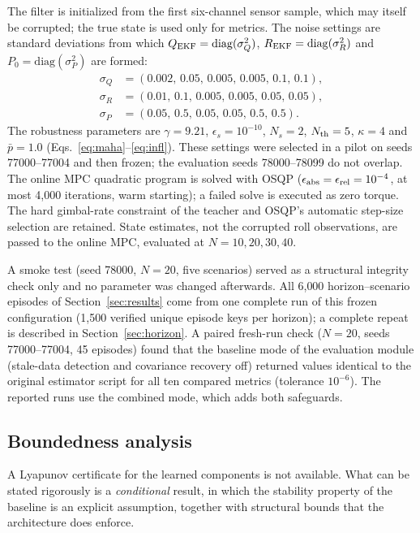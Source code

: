 \documentclass[preprint,12pt,authoryear=false]{elsarticle}
\theoremstyle{remark}\newtheorem{remark}{Remark}
\theoremstyle{plain}\newtheorem{proposition}{Proposition}\newtheorem{lemma}{Lemma}
\theoremstyle{definition}\newtheorem{assumption}{Assumption}
\begin{document}
The filter is initialized from the first six-channel sensor sample, which may itself be corrupted; the true state is used only for metrics. The noise settings are standard deviations from which $Q_{\rm EKF}=\mathrm{diag}(\sigma_Q^2)$, $R_{\rm EKF}=\mathrm{diag}(\sigma_R^2)$ and $P_0=\mathrm{diag}(\sigma_P^2)$ are formed:
\begin{align}
\sigma_Q&=(0.002,\,0.05,\,0.005,\,0.005,\,0.1,\,0.1),\\
\sigma_R&=(0.01,\,0.1,\,0.005,\,0.005,\,0.05,\,0.05),\\
\sigma_P&=(0.05,\,0.5,\,0.05,\,0.05,\,0.5,\,0.5).
\end{align}
The robustness parameters are $\gamma=9.21$, $\epsilon_s=10^{-10}$, $N_s=2$, $N_{\rm th}=5$, $\kappa=4$ and $\bar p=1.0$ (Eqs.~\eqref{eq:maha}--\eqref{eq:infl}). These settings were selected in a pilot on seeds 77000--77004 and then frozen; the evaluation seeds 78000--78099 do not overlap. The online MPC quadratic program is solved with OSQP ($\epsilon_{\rm abs}=\epsilon_{\rm rel}=10^{-4}$, at most 4{,}000 iterations, warm starting); a failed solve is executed as zero torque. The hard gimbal-rate constraint of the teacher and OSQP's automatic step-size selection are retained. State estimates, not the corrupted roll observations, are passed to the online MPC, evaluated at $N=10,20,30,40$.

A smoke test (seed 78000, $N=20$, five scenarios) served as a structural integrity check only and no parameter was changed afterwards. All 6{,}000 horizon--scenario episodes of Section~\ref{sec:results} come from one complete run of this frozen configuration (1{,}500 verified unique episode keys per horizon); a complete repeat is described in Section~\ref{sec:horizon}. A paired fresh-run check ($N=20$, seeds 77000--77004, 45 episodes) found that the baseline mode of the evaluation module (stale-data detection and covariance recovery off) returned values identical to the original estimator script for all ten compared metrics (tolerance $10^{-6}$). The reported runs use the combined mode, which adds both safeguards.

\subsection{Boundedness analysis}\label{sec:bound}
A Lyapunov certificate for the learned components is not available. What can be stated rigorously is a \emph{conditional} result, in which the stability property of the baseline is an explicit assumption, together with structural bounds that the architecture does enforce.
\end{document}
